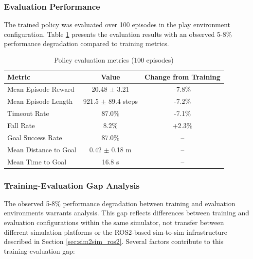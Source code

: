 \documentclass[12pt,a4paper]{article}
\begin{document}
\subsubsection{Evaluation Performance}

The trained policy was evaluated over 100 episodes in the play environment configuration. Table \ref{tab:eval_metrics} presents the evaluation results with an observed 5-8\% performance degradation compared to training metrics.

\begin{table}[htbp]
\centering
\caption{Policy evaluation metrics (100 episodes)}
\label{tab:eval_metrics}
\begin{tabular}{lcc}
\toprule
\textbf{Metric} & \textbf{Value} & \textbf{Change from Training} \\
\midrule
Mean Episode Reward & 20.48 $\pm$ 3.21 & -7.8\% \\
Mean Episode Length & 921.5 $\pm$ 89.4 steps & -7.2\% \\
Timeout Rate & 87.0\% & -7.1\% \\
Fall Rate & 8.2\% & +2.3\% \\
Goal Success Rate & 87.0\% & -- \\
Mean Distance to Goal & 0.42 $\pm$ 0.18 m & -- \\
Mean Time to Goal & 16.8 s & -- \\
\bottomrule
\end{tabular}
\end{table}

\subsubsection{Training-Evaluation Gap Analysis}

The observed 5-8\% performance degradation between training and evaluation environments warrants analysis. This gap reflects differences between training and evaluation configurations within the same simulator, not transfer between different simulation platforms or the ROS2-based sim-to-sim infrastructure described in Section \ref{sec:sim2sim_ros2}. Several factors contribute to this training-evaluation gap:
\end{document}

